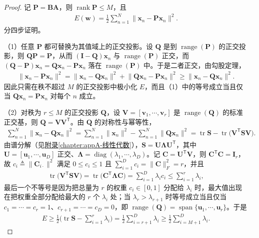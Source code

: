 \documentclass[../../main.tex]{subfiles}
\begin{document}
\begin{proof}
记 $\bm{P}=\bm{B}\bm{A}$，则 $\operatorname{rank}\bm{P}\leqslant M$，且
\begin{align*}
E(\bm{w})=\frac{1}{2}\sum_{n=1}^{N}\big\|\bm{x}_n-\bm{P}\bm{x}_n\big\|^{2}.
\end{align*}
分四步证明。

（1）任意 $\bm{P}$ 都可替换为其值域上的正交投影。设 $\bm{Q}$ 是到 $\operatorname{range}(\bm{P})$ 的正交投影，则 $\bm{Q}\bm{P}=\bm{P}$，从而 $(\bm{I}-\bm{Q})\bm{x}_n$ 与 $\operatorname{range}(\bm{P})$ 正交，而 $(\bm{Q}-\bm{P})\bm{x}_n=\bm{Q}\bm{x}_n-\bm{P}\bm{x}_n$ 落在 $\operatorname{range}(\bm{P})$ 中。于是二者正交，由勾股定理，
\begin{align*}
\big\|\bm{x}_n-\bm{P}\bm{x}_n\big\|^{2}=\big\|\bm{x}_n-\bm{Q}\bm{x}_n\big\|^{2}+\big\|\bm{Q}\bm{x}_n-\bm{P}\bm{x}_n\big\|^{2}\geqslant\big\|\bm{x}_n-\bm{Q}\bm{x}_n\big\|^{2}.
\end{align*}
因此只需在秩不超过 $M$ 的正交投影中极小化 $E$，而且（1）中的等号成立当且仅当 $\bm{Q}\bm{x}_n=\bm{P}\bm{x}_n$ 对每个 $n$ 成立。

（2）对秩为 $r\leqslant M$ 的正交投影 $\bm{Q}$，设 $\bm{V}=[\bm{v}_1,\cdots,\bm{v}_r]$ 是 $\operatorname{range}(\bm{Q})$ 的标准正交基，则 $\bm{Q}=\bm{V}\bm{V}^{\mathsf T}$。由 $\bm{Q}$ 的对称性与幂等性，
\begin{align*}
\sum_{n=1}^{N}\big\|\bm{x}_n-\bm{Q}\bm{x}_n\big\|^{2}=\sum_{n=1}^{N}\|\bm{x}_n\|^{2}-\sum_{n=1}^{N}\|\bm{Q}\bm{x}_n\|^{2}=\operatorname{tr}\bm{S}-\operatorname{tr}\big(\bm{V}^{\mathsf T}\bm{S}\bm{V}\big).
\end{align*}
由谱分解（见\hyperref[chapter:appA-线性代数]{附录\ref*{chapter:appA-线性代数}}），$\bm{S}=\bm{U}\bm{\Lambda}\bm{U}^{\mathsf T}$，其中 $\bm{U}=[\bm{u}_1,\cdots,\bm{u}_D]$ 正交、$\bm{\Lambda}=\operatorname{diag}(\lambda_1,\cdots,\lambda_D)$。记 $\bm{C}=\bm{U}^{\mathsf T}\bm{V}$，则 $\bm{C}^{\mathsf T}\bm{C}=\bm{I}_r$，故 $c_i\triangleq\|\bm{C}_{i\cdot}\|^{2}$ 满足 $0\leqslant c_i\leqslant1$ 且 $\sum_{i=1}^{D}c_i=\|\bm{C}\|_F^{2}=r$，并且
\begin{align*}
\operatorname{tr}\big(\bm{V}^{\mathsf T}\bm{S}\bm{V}\big)=\operatorname{tr}\big(\bm{C}^{\mathsf T}\bm{\Lambda}\bm{C}\big)=\sum_{i=1}^{D}\lambda_i c_i\leqslant\sum_{i=1}^{r}\lambda_i,
\end{align*}
最后一个不等号是因为把总量为 $r$ 的权重 $c_i\in[0,1]$ 分配给 $\lambda_i$ 时，最大值出现在把权重全部分配给最大的 $r$ 个 $\lambda_i$ 处；当 $\lambda_r>\lambda_{r+1}$ 时等号成立当且仅当 $c_1=\cdots=c_r=1$、$c_{r+1}=\cdots=c_D=0$，即 $\operatorname{range}(\bm{Q})=\operatorname{span}\{\bm{u}_1,\cdots,\bm{u}_r\}$。于是
\begin{align*}
E\geqslant\frac{1}{2}\Big(\operatorname{tr}\bm{S}-\sum_{i=1}^{r}\lambda_i\Big)=\frac{1}{2}\sum_{i=r+1}^{D}\lambda_i\geqslant\frac{1}{2}\sum_{i=M+1}^{D}\lambda_i.
\end{align*}


\end{proof}
\end{document}
